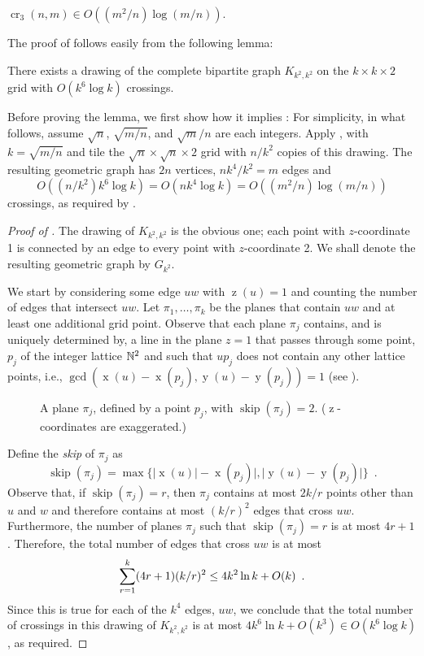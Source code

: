 \documentclass{patmorin}
\DeclareMathOperator{\x}{x}
\DeclareMathOperator{\y}{y}
\DeclareMathOperator{\z}{z}
\DeclareMathOperator{\crs}{cr}
\DeclareMathOperator{\skp}{skip}
\begin{document}
\begin{thm}
  $\crs_3(n,m) \in O((m^2/n)\log (m/n))$.
\end{thm}

The proof of  follows easily from the following lemma:
\begin{lem}
  There exists a drawing of the complete bipartite graph $K_{k^2,k^2}$
  on the $k\times k\times 2$ grid with $O(k^6\log k)$ crossings.
\end{lem}

Before proving the lemma, we first show how it implies
: For simplicity, in what follows, assume $\sqrt{n}$,
$\sqrt{m/n}$, and $\sqrt{m}/n$ are each integers.  Apply ,
with $k=\sqrt{m/n}$ and tile the $\sqrt{n}\times\sqrt{n}\times 2$ grid
with $n/k^2$ copies of this drawing. The resulting geometric graph has
$2n$ vertices, $nk^4/k^2=m$ edges and
\[ O((n/k^2)k^6\log k) = O(nk^4\log k) = O((m^2/n)\log(m/n))
\] 
crossings, as required by .

\begin{proof}[Proof of ]
The drawing of $K_{k^2,k^2}$ is the obvious one; each point with
$z$-coordinate 1 is connected by an edge to every point with
$z$-coordinate 2.  We shall denote the resulting geometric graph
by $G_{k^2}$.

We start by considering some edge $uw$ with $\z(u)=1$ and counting
the number of edges that intersect $uw$.  Let $\pi_1,\ldots,\pi_k$ be
the planes that contain $uw$ and at least one additional grid point.
Observe that each plane $\pi_j$ contains, and is uniquely determined by,
a line in the plane $z=1$ that passes through some point, $p_j$ of the
integer lattice $\mathbb{N}^2$ and such that $up_j$ does not contain any other
lattice points, i.e., $\gcd(\x(u)-\x(p_j),\y(u)-\y(p_j))=1$ (see ).
\begin{figure}
  \caption{A plane $\pi_j$, defined by a point $p_j$, with $\skp(\pi_j)=2$. ($\z$-coordinates are exaggerated.)}
\end{figure}
Define the \emph{skip} of $\pi_j$ as
\[
   \skp(\pi_j)=\max\{|\x(u)|-\x(p_j)|,|\y(u)-\y(p_j)|\} \enspace .
\]
Observe that, if $\skp(\pi_j)=r$, then $\pi_j$ contains at most $2k/r$
points other than $u$ and $w$ and therefore contains at most $(k/r)^2$
edges that cross $uw$.  Furthermore, the number of planes $\pi_j$ such
that $\skp(\pi_j)=r$ is at most $4r+1$.  Therefore, the total number
of edges that cross $uw$ is at most
\begin{equation}
   \sum_{r=1}^k (4r+1)(k/r)^2 \le 4k^2\ln k + O(k) \enspace . \eqlabel{critical}
\end{equation}
Since this is true for each of the $k^4$ edges, $uw$, we conclude that
the total number of crossings in this drawing of $K_{k^2,k^2}$ is at
most $4k^6\ln k+O(k^3)\in O(k^6\log k)$, as required.
\end{proof}
\end{document}
